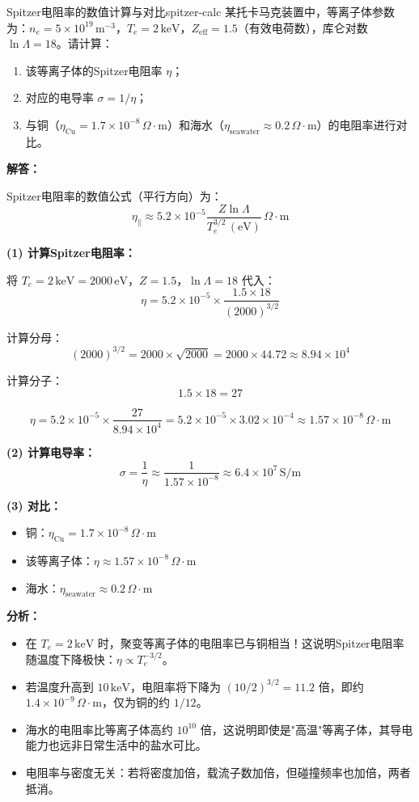 \begin{example}{Spitzer电阻率的数值计算与对比}{spitzer-calc}
某托卡马克装置中，等离子体参数为：$n_e = 5\times 10^{19}\,\mathrm{m}^{-3}$，$T_e = 2\,\mathrm{keV}$，$Z_{\text{eff}} = 1.5$（有效电荷数），库仑对数 $\ln\Lambda = 18$。请计算：
\begin{enumerate}[label=(\arabic*)]
\item 该等离子体的Spitzer电阻率 $\eta$；
\item 对应的电导率 $\sigma = 1/\eta$；
\item 与铜（$\eta_{\text{Cu}} = 1.7\times 10^{-8}\,\Omega\cdot\mathrm{m}$）和海水（$\eta_{\text{seawater}} \approx 0.2\,\Omega\cdot\mathrm{m}$）的电阻率进行对比。
\end{enumerate}
\tcblower
\textbf{解答：}

Spitzer电阻率的数值公式（平行方向）为：
\[
\eta_{\parallel} \approx 5.2\times 10^{-5}\frac{Z\ln\Lambda}{T_e^{3/2}\,\mathrm{(eV)}}\,\Omega\cdot\mathrm{m}
\]

\textbf{(1) 计算Spitzer电阻率：}

将 $T_e = 2\,\mathrm{keV} = 2000\,\mathrm{eV}$，$Z = 1.5$，$\ln\Lambda = 18$ 代入：
\[
\eta = 5.2\times 10^{-5}\times\frac{1.5\times 18}{(2000)^{3/2}}
\]

计算分母：
\[
(2000)^{3/2} = 2000\times\sqrt{2000} = 2000\times 44.72 \approx 8.94\times 10^4
\]

计算分子：
\[
1.5\times 18 = 27
\]

\[
\eta = 5.2\times 10^{-5}\times\frac{27}{8.94\times 10^4}
= 5.2\times 10^{-5}\times 3.02\times 10^{-4}
\approx 1.57\times 10^{-8}\,\Omega\cdot\mathrm{m}
\]

\textbf{(2) 计算电导率：}
\[
\sigma = \frac{1}{\eta} \approx \frac{1}{1.57\times 10^{-8}} \approx 6.4\times 10^{7}\,\mathrm{S/m}
\]

\textbf{(3) 对比：}
\begin{itemize}[leftmargin=*,itemsep=0pt]
\item 铜：$\eta_{\text{Cu}} = 1.7\times 10^{-8}\,\Omega\cdot\mathrm{m}$
\item 该等离子体：$\eta \approx 1.57\times 10^{-8}\,\Omega\cdot\mathrm{m}$
\item 海水：$\eta_{\text{seawater}} \approx 0.2\,\Omega\cdot\mathrm{m}$
\end{itemize}

\textbf{分析：}
\begin{itemize}[leftmargin=*,itemsep=0pt]
\item 在 $T_e = 2\,\mathrm{keV}$ 时，聚变等离子体的电阻率已与铜相当！这说明Spitzer电阻率随温度下降极快：$\eta \propto T_e^{-3/2}$。
\item 若温度升高到 $10\,\mathrm{keV}$，电阻率将下降为 $(10/2)^{3/2} = 11.2$ 倍，即约 $1.4\times 10^{-9}\,\Omega\cdot\mathrm{m}$，仅为铜的约 $1/12$。
\item 海水的电阻率比等离子体高约 $10^{10}$ 倍，这说明即使是"高温"等离子体，其导电能力也远非日常生活中的盐水可比。
\item 电阻率与密度无关：若将密度加倍，载流子数加倍，但碰撞频率也加倍，两者抵消。
\end{itemize}
\end{example}

